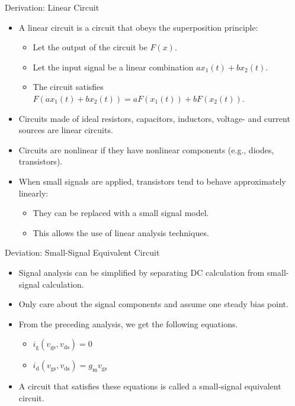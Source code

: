 \begin{frame}{Derivation: Linear Circuit}
    \begin{itemize}
        \item A linear circuit is a circuit that obeys the superposition principle:
        \begin{itemize}
            \item Let the output of the circuit be $F(x)$.
            \item Let the input signal be a linear combination $a x_{1}(t)+b x_{2}(t)$.
            \item The circuit satisfies $F(a x_{1}(t) + b x_{2}(t)) = a F(x_{1}(t)) + b F(x_{2}(t))$.
        \end{itemize}
        \item Circuits made of ideal resistors, capacitors, inductors, voltage- and current sources are linear circuits.
        \item Circuits are nonlinear if they have nonlinear components (e.g., diodes, transistors).
        \item When small signals are applied, transistors tend to behave approximately linearly:
        \begin{itemize}
            \item They can be replaced with a small signal model.
            \item This allows the use of linear analysis techniques.
        \end{itemize}
    \end{itemize}
\end{frame}

\begin{frame}{Deviation: Small-Signal Equivalent Circuit}
    \begin{itemize}
        \item Signal analysis can be simplified by separating DC calculation from small-signal calculation.
        \item Only care about the signal components and assume one steady bias point.
        \item From the preceding analysis, we get the following equations.
        \begin{itemize}
            \item $i_{\mathrm{g}}(v_{\mathrm{gs}}, v_{\mathrm{ds}})=0$ \\
            \item $i_{\mathrm{d}}(v_{\mathrm{gs}}, v_{\mathrm{ds}})=g_{\mathrm{m}}v_{\mathrm{gs}}$
        \end{itemize}
        \item A circuit that satisfies these equations is called a small-signal equivalent circuit.
    \end{itemize}
\end{frame}

